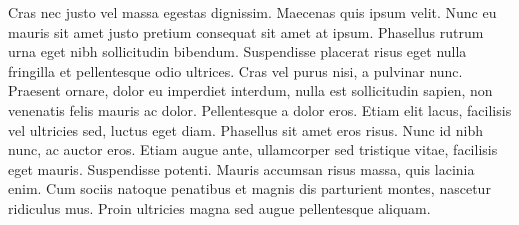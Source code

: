 Cras nec justo vel massa egestas dignissim.
Maecenas quis ipsum velit.
Nunc eu mauris sit amet justo pretium consequat sit amet at ipsum.
Phasellus rutrum urna eget nibh sollicitudin bibendum.
Suspendisse placerat risus eget nulla fringilla et pellentesque odio ultrices.
Cras vel purus nisi, a pulvinar nunc.
Praesent ornare, dolor eu imperdiet interdum, nulla est sollicitudin sapien, non venenatis felis mauris ac dolor.
Pellentesque a dolor eros.
Etiam elit lacus, facilisis vel ultricies sed, luctus eget diam.
Phasellus sit amet eros risus.
Nunc id nibh nunc, ac auctor eros.
Etiam augue ante, ullamcorper sed tristique vitae, facilisis eget mauris.
Suspendisse potenti.
Mauris accumsan risus massa, quis lacinia enim.
Cum sociis natoque penatibus et magnis dis parturient montes, nascetur ridiculus mus.
Proin ultricies magna sed augue pellentesque aliquam.
